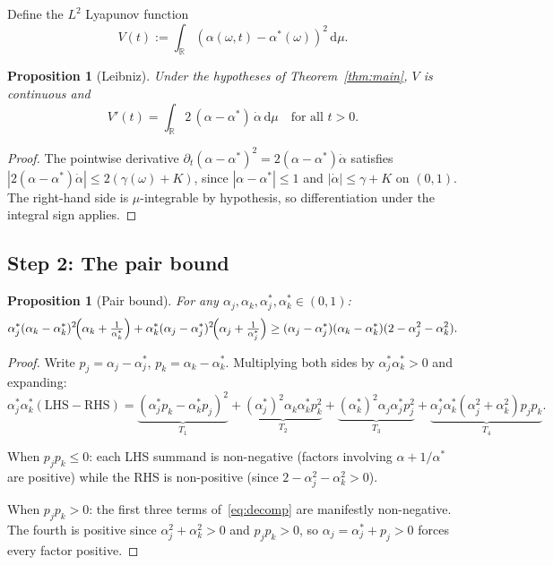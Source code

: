 \documentclass[11pt,a4paper]{article}
\newtheorem{proposition}[theorem]{Proposition}
\theoremstyle{definition}
\newcommand{\R}{\mathbb{R}}
\begin{document}
Define the $L^2$ Lyapunov function
\begin{equation}\label{eq:V}
V(t) := \int_\R (\alpha(\omega,t) - \alpha^*(\omega))^2\,\mathrm{d}\mu.
\end{equation}

\begin{proposition}[Leibniz]\label{prop:leibniz}
Under the hypotheses of Theorem~\ref{thm:main}, $V$ is continuous and
\[
V'(t) = \int_\R 2\,(\alpha - \alpha^*)\,\dot\alpha\,\mathrm{d}\mu \quad\text{for all } t>0.
\]
\end{proposition}

\begin{proof}
The pointwise derivative $\partial_t(\alpha-\alpha^*)^2 = 2(\alpha-\alpha^*)\dot\alpha$ satisfies $|2(\alpha-\alpha^*)\dot\alpha| \leq 2(\gamma(\omega)+K)$, since $|\alpha-\alpha^*|\leq 1$ and $|\dot\alpha|\leq\gamma+K$ on $(0,1)$. The right-hand side is $\mu$-integrable by hypothesis, so differentiation under the integral sign applies.
\end{proof}

\subsection{Step 2: The pair bound}\label{sec:pair}

\begin{proposition}[Pair bound]\label{prop:pair}
For any $\alpha_j,\alpha_k,\alpha^*_j,\alpha^*_k\in(0,1)$:
\begin{equation}\label{eq:pair}
\alpha^*_j(\alpha_k-\alpha^*_k)^2\!\Bigl(\alpha_k+\tfrac{1}{\alpha^*_k}\Bigr) + \alpha^*_k(\alpha_j-\alpha^*_j)^2\!\Bigl(\alpha_j+\tfrac{1}{\alpha^*_j}\Bigr) \geq (\alpha_j-\alpha^*_j)(\alpha_k-\alpha^*_k)(2-\alpha_j^2-\alpha_k^2).
\end{equation}
\end{proposition}

\begin{proof}
Write $p_j=\alpha_j-\alpha^*_j$, $p_k=\alpha_k-\alpha^*_k$. Multiplying both sides by $\alpha^*_j\alpha^*_k>0$ and expanding:
\begin{equation}\label{eq:decomp}
\alpha^*_j\alpha^*_k(\text{LHS}-\text{RHS}) = \underbrace{(\alpha^*_jp_k-\alpha^*_kp_j)^2}_{T_1} + \underbrace{(\alpha^*_j)^2\alpha_k\alpha^*_kp_k^2}_{T_2} + \underbrace{(\alpha^*_k)^2\alpha_j\alpha^*_jp_j^2}_{T_3} + \underbrace{\alpha^*_j\alpha^*_k(\alpha_j^2+\alpha_k^2)p_jp_k}_{T_4}.
\end{equation}

When $p_jp_k\leq 0$: each LHS summand is non-negative (factors involving $\alpha+1/\alpha^*$ are positive) while the RHS is non-positive (since $2-\alpha_j^2-\alpha_k^2>0$).

When $p_jp_k>0$: the first three terms of~\eqref{eq:decomp} are manifestly non-negative. The fourth is positive since $\alpha_j^2+\alpha_k^2>0$ and $p_jp_k>0$, so $\alpha_j=\alpha^*_j+p_j>0$ forces every factor positive.
\end{proof}
\end{document}
